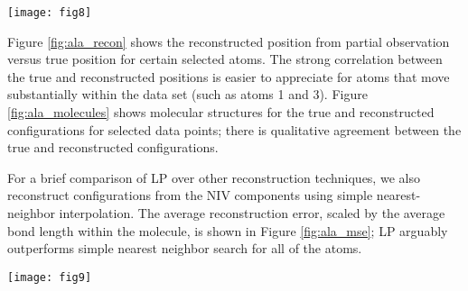 \documentclass[aip,jcp,preprint]{revtex4-1}
\begin{document}

\begin{figure*}[ht]
    \texttt{[image: fig8]}
    \caption{The 3-dimensional NIV embedding for Ala2 computed using $\mathcal{Y}_{all}$, colored by (a) the y-coordinate of the first atom, (b) the dihedral angle $\phi$, and (c) the dihedral angle $\psi$. Each embedding is rotated so that the correlation between the colors and the relevant NIV can easily be seen.}
    \label{fig:ala_embed}
\end{figure*}


Figure \ref{fig:ala_recon} shows the reconstructed position from partial observation versus true position for certain selected atoms.
%
The strong correlation between the true and reconstructed positions is easier to appreciate for
atoms that move substantially within the data set (such as atoms 1 and 3).
%
Figure \ref{fig:ala_molecules} shows molecular structures for the true and reconstructed configurations for selected data points;
there is qualitative agreement between the true and reconstructed configurations.

For a brief comparison of LP over other reconstruction techniques, we also reconstruct configurations from the
NIV components using simple nearest-neighbor interpolation.
%
The average reconstruction error, scaled by the average bond length within the molecule, is shown in Figure \ref{fig:ala_mse};
LP arguably outperforms simple nearest neighbor search for all of the atoms.

\begin{figure*}[ht]
  \centering
        \texttt{[image: fig9]}
  \caption{The correlation between the true position and the reconstructed position (using LP) for the test data. The columns correspond the x-, y-, and z-coordinates, and the rows correspond to atoms 1, 2, 3, 6, and 8.}
  \label{fig:ala_recon}
\end{figure*}
\end{document}
